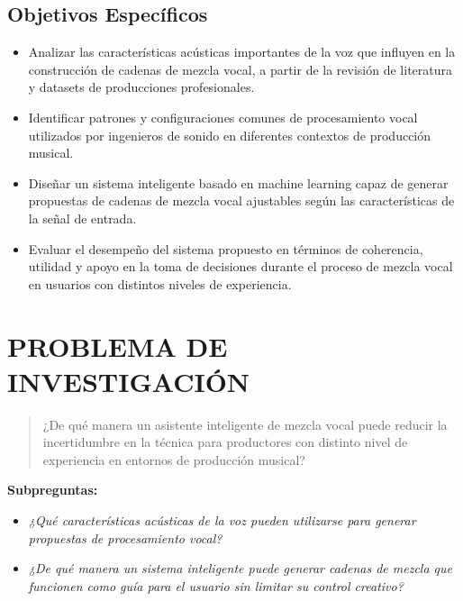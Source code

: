 \documentclass[12pt]{article}
\begin{document}
\subsection*{Objetivos Específicos}

\begin{itemize}
    \item Analizar las características acústicas importantes de la voz que influyen en la construcción de cadenas de mezcla vocal, a partir de la revisión de literatura y datasets de producciones profesionales.
    \item Identificar patrones y configuraciones comunes de procesamiento vocal utilizados por ingenieros de sonido en diferentes contextos de producción musical.
    \item Diseñar un sistema inteligente basado en machine learning capaz de generar propuestas de cadenas de mezcla vocal ajustables según las características de la señal de entrada.
    \item Evaluar el desempeño del sistema propuesto en términos de coherencia, utilidad y apoyo en la toma de decisiones durante el proceso de mezcla vocal en usuarios con distintos niveles de experiencia.
\end{itemize}

\section{PROBLEMA DE INVESTIGACIÓN}

\begin{quote}
¿De qué manera un asistente inteligente de mezcla vocal puede reducir la incertidumbre en la técnica para productores con distinto nivel de experiencia en entornos de producción musical?
\end{quote}

\textbf{Subpreguntas:}

\begin{itemize}
    \item \textit{¿Qué características acústicas de la voz pueden utilizarse para generar propuestas de procesamiento vocal?}
    \item \textit{¿De qué manera un sistema inteligente puede generar cadenas de mezcla que funcionen como guía para el usuario sin limitar su control creativo?}
\end{itemize}
\end{document}
